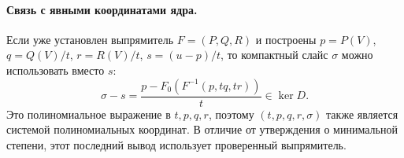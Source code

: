 \paragraph{Связь с явными координатами ядра.}
Если уже установлен выпрямитель $F=(P,Q,R)$ и построены
$p=P(V)$, $q=Q(V)/t$, $r=R(V)/t$, $s=(u-p)/t$, то компактный слайс
$\sigma$ можно использовать вместо $s$:
\[
 \sigma-s=\frac{p-F_0(F^{-1}(p,tq,tr))}{t}\in\ker D.
\]
Это полиномиальное выражение в $t,p,q,r$, поэтому
$(t,p,q,r,\sigma)$ также является системой полиномиальных координат.
В отличие от утверждения о минимальной степени, этот последний вывод
использует проверенный выпрямитель.
